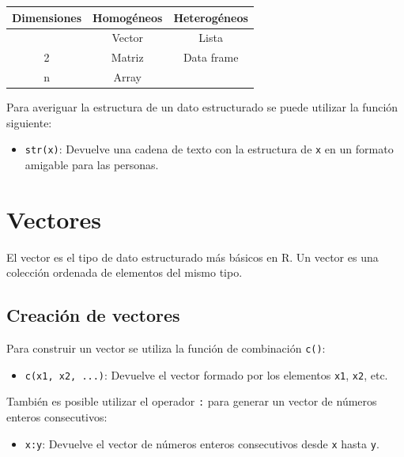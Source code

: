 \documentclass[
  spanish,
  a4paper,
]{scrreport}
\newcounter{none} %
\providecommand{\tightlist}{%
  \setlength{\itemsep}{0pt}\setlength{\parskip}{0pt}}
\theoremstyle{definition}
\theoremstyle{definition}
\theoremstyle{remark}
\begin{document}
{\def\LTcaptype{none} %
\begin{longtable}[]{@{}ccc@{}}
\toprule\noalign{}
Dimensiones & Homogéneos & Heterogéneos \\
\midrule\noalign{}
\endhead
\bottomrule\noalign{}
\endlastfoot
1 & Vector & Lista \\
2 & Matriz & Data frame \\
n & Array & \\
\end{longtable}
}

Para averiguar la estructura de un dato estructurado se puede utilizar
la función siguiente:

\begin{itemize}
\tightlist
\item
  \texttt{str(x)}: Devuelve una cadena de texto con la estructura de
  \texttt{x} en un formato amigable para las personas.
\end{itemize}

\section{Vectores}\label{vectores}

El vector es el tipo de dato estructurado más básicos en R. Un vector es
una colección ordenada de elementos del mismo tipo.

\subsection{Creación de vectores}\label{creaciuxf3n-de-vectores}

Para construir un vector se utiliza la función de combinación
\texttt{c()}:

\begin{itemize}
\tightlist
\item
  \texttt{c(x1,\ x2,\ ...)}: Devuelve el vector formado por los
  elementos \texttt{x1}, \texttt{x2}, etc.
\end{itemize}

También es posible utilizar el operador \texttt{:} para generar un
vector de números enteros consecutivos:

\begin{itemize}
\tightlist
\item
  \texttt{x:y}: Devuelve el vector de números enteros consecutivos desde
  \texttt{x} hasta \texttt{y}.
\end{itemize}
\end{document}
